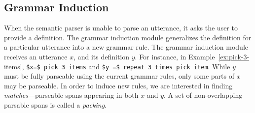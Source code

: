 


\subsection{Grammar Induction}
\label{subsec:grammarInduction}

When the semantic parser is unable to parse an utterance,
it asks the user to provide a definition.
The grammar induction module generalizes the definition for a particular
utterance into a new grammar rule.
The grammar induction module receives an utterance $x$, and its definition $y$.
For instance, in Example~\ref{ex:pick-3-items}, \lstinline{$x=$ pick 3 items} and
\lstinline{$y =$ repeat 3 times pick item}.
While $y$ must be fully parseable using the current grammar rules, only some parts of $x$ may be parseable.
In order to induce new rules, we are interested in finding \textit{matches}---parseable spans appearing in both $x$ and $y$.
A set of non-overlapping parsable spans is called a \emph{packing}.

